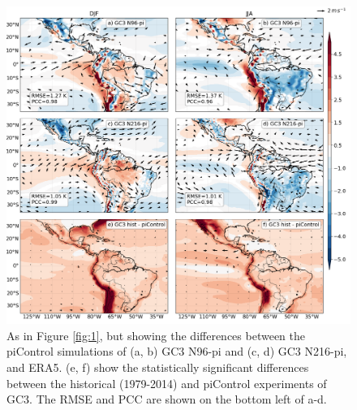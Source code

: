 
\begin{figure}[t!]
\centering
 \includegraphics[width=\linewidth]{figures/fig1p2_f1b.png}
\caption[Temperature and SLP biases in UKESM1 and HadGEM3]{ As in Figure \ref{fig:1}, but showing the differences between the piControl simulations of (a, b) GC3 N96-pi and (c, d) GC3 N216-pi, and ERA5. (e, f) show the statistically significant differences between the historical (1979-2014) and piControl experiments of GC3.  The RMSE and PCC are shown on the bottom left of a-d.}
\label{fig:1b}
\end{figure}

